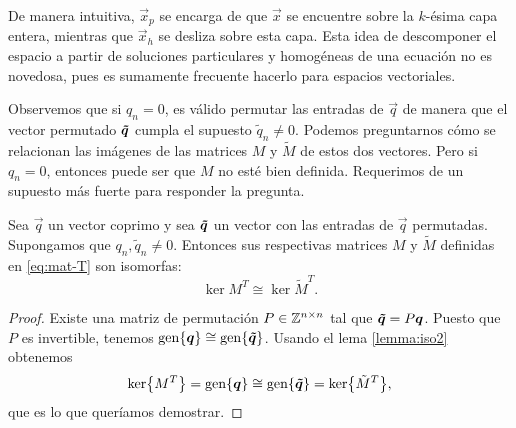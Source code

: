 De manera intuitiva, $\vec{x}_p$ se encarga de que $\vec{x}$ se encuentre sobre la $k$-ésima capa
entera, mientras que $\vec{x}_h$ se desliza sobre esta capa. Esta idea de descomponer el
espacio a partir de soluciones particulares y homogéneas de una ecuación no es novedosa,
pues es sumamente frecuente hacerlo para espacios vectoriales.

Observemos que si $q_n = 0$, es válido permutar las entradas de $\vec{q}$ de
manera que el vector permutado $\boldsymbol{\tilde{q}}$ cumpla el supuesto $\tilde{q}_n \neq
0$. Podemos preguntarnos cómo se relacionan las imágenes de las matrices $M$ y
$\tilde{M}$ de estos dos vectores. Pero si $q_n = 0$, entonces puede ser que
$M$ no esté bien definida. Requerimos de un supuesto más fuerte para responder
la pregunta.

\begin{corollary}
	\label{cor:iso3}
	Sea $\vec{q}$ un vector coprimo y sea $\boldsymbol{\tilde{q}}$ un vector con las entradas de $\vec{q}$
	permutadas. Supongamos que $q_n, \tilde{q}_n \neq 0$. Entonces sus respectivas matrices $M$ y
	$\tilde{M}$ definidas en \eqref{eq:mat-T} son isomorfas:
	\begin{equation*}
		\ker{M^T} \cong \ker{\tilde{M}^T}.
	\end{equation*}
\end{corollary}
\begin{proof}
	Existe una matriz de permutación $P \in \mathbb{Z}^{n \times n}$ tal que $\boldsymbol{\tilde{q}} = P\boldsymbol{q}$.
	Puesto que $P$ es invertible, tenemos $\operatorname{gen}\lbrace \boldsymbol{q} \rbrace \cong
	\operatorname{gen}\lbrace \boldsymbol{\tilde{q}} \rbrace$. Usando el lema \ref{lemma:iso2} obtenemos
	\begin{equation*}
		\mathop{\mathrm{ker}{\left\lbrace M^T \right\rbrace}} = \operatorname{gen}\lbrace \boldsymbol{q} \rbrace \cong \operatorname{gen}\lbrace \boldsymbol{\tilde{q}} \rbrace = \mathop{\mathrm{ker}{\left\lbrace \tilde{M}^T \right\rbrace}},
	\end{equation*}
	que es lo que queríamos demostrar.
\end{proof}
